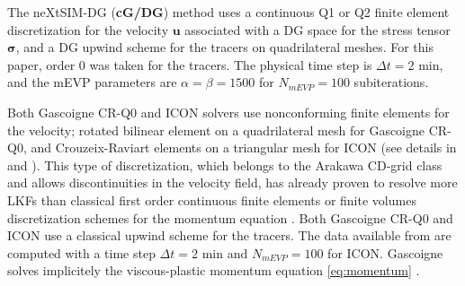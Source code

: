 \documentclass[11pt]{article}
\newcommand{\bu}{\mathbf{u}}
\newcommand{\sig}{\boldsymbol{\sigma}}
\begin{document}
The neXtSIM-DG (\textbf{cG/DG}) method uses a continuous Q1 or Q2 finite element discretization for the velocity $\bu$ associated with a DG space for the stress tensor $\sig$, and a DG upwind scheme for the tracers on quadrilateral meshes. For this paper, order 0 was taken for the tracers. The physical time step is $\Delta t=2$ min, and the mEVP parameters are $\alpha = \beta = 1500$ for $N_{mEVP} = 100$ subiterations.

Both Gascoigne CR-Q0 and ICON solvers use nonconforming finite elements for the velocity; rotated bilinear element \cite{https://doi.org/10.1002/num.1690080202} on a quadrilateral mesh for Gascoigne CR-Q0, and Crouzeix-Raviart elements on a triangular mesh for ICON (see details in \cite{Mehlmann2021} and \cite{MehlmannLKF2021}). This type of discretization, which belongs to the Arakawa CD-grid class and allows  discontinuities in the velocity field, has already proven to resolve more LKFs than classical first order continuous finite elements or finite volumes discretization schemes for the momentum equation \cite{MehlmannLKF2021, Mehlmann2021}. Both Gascoigne CR-Q0 and ICON use a classical upwind scheme for the tracers. The data available from \cite{MehlmannLKF2021} are computed with a time step $\Delta t = 2$ min and $N_{mEVP} = 100$ for ICON. Gascoigne solves implicitely the viscous-plastic momentum equation \eqref{eq:momentum} \cite{Mehlmann2017}.
\end{document}

